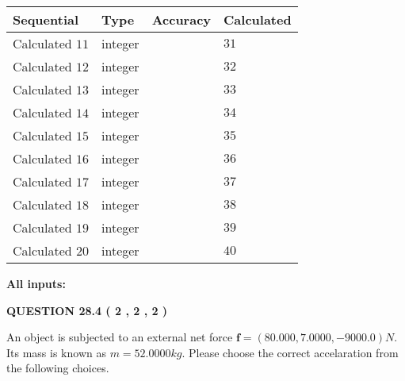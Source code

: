 \documentclass[12pt]{article}
\begin{document}
   
  
  
\noindent\begin{tabular}{|l|l|l|l|}
\hline
 Sequential & Type & Accuracy & Calculated \\ 
\hline
 
 
  Calculated $           11 $ & integer &  & 
  $ 31 $ 
 \\  \hline  
 
 
  Calculated $           12 $ & integer &  & 
  $ 32 $ 
 \\  \hline  
 
 
  Calculated $           13 $ & integer &  & 
  $ 33 $ 
 \\  \hline  
 
 
  Calculated $           14 $ & integer &  & 
  $ 34 $ 
 \\  \hline  
 
 
  Calculated $           15 $ & integer &  & 
  $ 35 $ 
 \\  \hline  
 
 
  Calculated $           16 $ & integer &  & 
  $ 36 $ 
 \\  \hline  
 
 
  Calculated $           17 $ & integer &  & 
  $ 37 $ 
 \\  \hline  
 
 
  Calculated $           18 $ & integer &  & 
  $ 38 $ 
 \\  \hline  
 
 
  Calculated $           19 $ & integer &  & 
  $ 39 $ 
 \\  \hline  
 
 
  Calculated $           20 $ & integer &  & 
  $ 40 $ 
 \\  \hline  
 \end{tabular}
   
   
   
   
\noindent\vspace{0.1in}\hspace{-0.08in} {\textbf{\Large{All inputs: }}}
   
   
  
\vspace{0.2in}
  
{\textbf{\Large{QUESTION
28.4 
 (           2 ,           2 ,           2 )
}}}
  
  
 
An object is subjected to an external net force $\mathbf{f}=(
80.000 ,
7.0000,
-9000.0  )N$. Its mass is known as
$m= %
52.0000  kg$. Please choose the correct accelaration
from the following choices.
 
\end{document}
